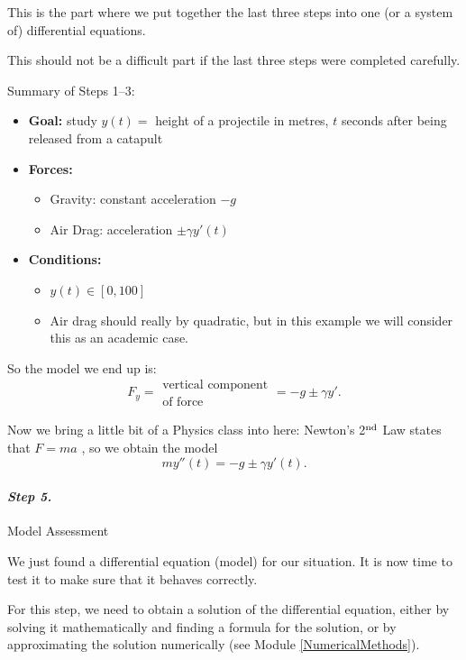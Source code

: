 This is the part where we put together the last three steps into one (or a system of) differential equations.

This should not be a difficult part if the last three steps were completed carefully.

\begin{example}

Summary of Steps 1--3:
\begin{itemize}
	\item \textbf{Goal:} study $y(t) = $ height of a projectile in metres, $t$ seconds after being released from a catapult
	\item \textbf{Forces:}
	\begin{itemize}
		\item Gravity: constant acceleration $-g$
		\item Air Drag: acceleration $\pm \gamma y'(t)$
	\end{itemize}
	\item \textbf{Conditions:}
	\begin{itemize}
		\item $y(t) \in [0,100]$
		\item Air drag should really by quadratic, but in this example we will consider this as an academic case.
	\end{itemize}
\end{itemize}

So the model we end up is:
$$
F_y = \substack{\text{vertical component}\\\text{of force}} = -g \pm \gamma y'.
$$

Now we bring a little bit of a Physics class into here: Newton's 2$^{\rm nd}$ Law states that \quad $F = m a$ \quad, so we obtain the model
$$m y''(t) =  -g \pm \gamma y'(t).$$
\end{example}



\paragraph{\emph{Step 5.}} Model Assessment

We just found a differential equation (model) for our situation. It is now time to test it to make sure that it behaves correctly.

For this step, we need to obtain a solution of the differential equation, either by solving it mathematically and finding a formula for the solution, or by approximating the solution numerically (see Module \ref{NumericalMethods}).

